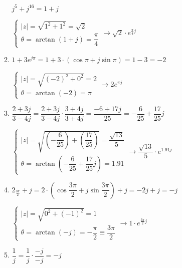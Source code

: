 \begin{enumerate}[label=\color{red}\textbf{\arabic*)}]
\begin{enumerate}[label=\color{red}\textbf{\textbf{\textbf{\alph*)}}}]
                $j^5+j^{16}=1+j$ 

                $\begin{cases}
                    |z|=\sqrt{1^2+1^2}=\sqrt{2}\\
                    \theta=\arctan(1+j)=\dfrac{\pi}{4}
                \end{cases}\longrightarrow \sqrt{2}\cdot e^{\frac{\pi}{4} j}  $
            \item {} 

                $1+3e^{j\pi}=1+3\cdot \left( \cos\pi+j\sin\pi \right) =1-3=-2$ 

                $\begin{cases}
                    |z|=\sqrt{(-2)^2+0^2}=2\\
                    \theta=\arctan(-2)=\pi
                \end{cases}\longrightarrow 2e^{\pi j} $
            \item {} 

                $\dfrac{2+3j}{3-4j}=\dfrac{2+3j}{3-4j}\cdot \dfrac{3+4j}{3+4j}=\dfrac{-6+17j}{25}=-\dfrac{6}{25}+\dfrac{17}{25}j$

                $\begin{cases}
                    |z|=\sqrt{\left( -\dfrac{6}{25} \right) +\left( \dfrac{17}{25} \right) }=\dfrac{\sqrt{13} }{5}\\
                    \theta=\arctan\left( -\dfrac{6}{25}+\dfrac{17}{25}j \right) = 1.91
                \end{cases}\longrightarrow \dfrac{\sqrt{13} }{5}\cdot e^{1.91j} $
            \item {} 

                $2_{\frac{3\pi}{2} }+j=2\cdot \left( \cos \dfrac{3\pi}{2}+j\sin\dfrac{3\pi}{2}  \right)+j=-2j+j=-j $

                $\begin{cases}
                    |z|=\sqrt{0^2+(-1)^2}=1\\
                    \theta=\arctan(-j)=-\dfrac{\pi}{2}\equiv \dfrac{3\pi}{2}
                \end{cases}\longrightarrow 1\cdot e^{\frac{3\pi}{2} j} $
            \item {} 

                $\dfrac{1}{j}=\dfrac{1}{j}\cdot \dfrac{-j}{-j}=-j$ 


\end{enumerate}
\end{enumerate}
